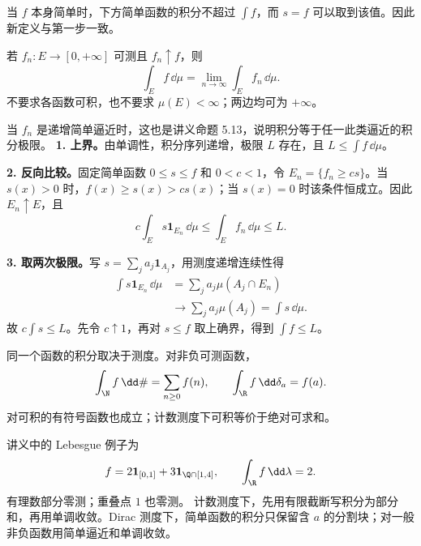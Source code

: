 当 $f$ 本身简单时，下方简单函数的积分不超过 $\int f$，而 $s=f$ 可以取到该值。因此新定义与第一步一致。

若 $f_n:E\to[0,+\infty]$ 可测且 $f_n\uparrow f$，则
\[
\int_E f\,\dd\mu=\lim_{n\to\infty}\int_E f_n\,\dd\mu.
\]
不要求各函数可积，也不要求 $\mu(E)<\infty$；两边均可为 $+\infty$。

当 $f_n$ 是递增简单逼近时，这也是讲义命题 5.13，说明积分等于任一此类逼近的积分极限。
\textbf{1. 上界。}由单调性，积分序列递增，极限 $L$ 存在，且 $L\le\int f\,\dd\mu$。

\textbf{2. 反向比较。}固定简单函数 $0\le s\le f$ 和 $0<c<1$，令 $E_n=\{f_n\ge cs\}$。当 $s(x)>0$ 时，$f(x)\ge s(x)>cs(x)$；当 $s(x)=0$ 时该条件恒成立。因此 $E_n\uparrow E$，且
\[
c\int_E s\mathbf1_{E_n}\,\dd\mu
\le\int_E f_n\,\dd\mu\le L.
\]

\textbf{3. 取两次极限。}写 $s=\sum_j a_j\mathbf1_{A_j}$，用测度递增连续性得
\[
\begin{aligned}
\int s\mathbf1_{E_n}\,\dd\mu
&=\sum_j a_j\mu(A_j\cap E_n)\\
&\longrightarrow\sum_j a_j\mu(A_j)=\int s\,\dd\mu.
\end{aligned}
\]
故 $c\int s\le L$。先令 $c\uparrow1$，再对 $s\le f$ 取上确界，得到 $\int f\le L$。

同一个函数的积分取决于测度。对非负可测函数，
\[
\int_{\N} f\,\dd\#=\sum_{n\ge0}f(n),
\qquad
\int_{\R}f\,\dd\delta_a=f(a).
\]
对可积的有符号函数也成立；计数测度下可积等价于绝对可求和。

讲义中的 Lebesgue 例子为
\[
f=2\mathbf1_{[0,1]}+3\mathbf1_{\Q\cap[1,4]},
\qquad \int_{\R}f\,\dd\lambda=2.
\]
有理数部分零测；重叠点 $1$ 也零测。
计数测度下，先用有限截断写积分为部分和，再用单调收敛。Dirac 测度下，简单函数的积分只保留含 $a$ 的分割块；对一般非负函数用简单逼近和单调收敛。

